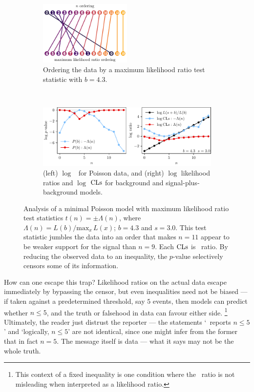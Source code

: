 \begin{figure}[tp]
\centering
\begin{subfigure}{\textwidth}
\centering
\includegraphics[width=0.5\textwidth]{figures/searches_cls_plots_with_pvals_order.pdf}
\caption{%
Ordering the data by a maximum likelihood ratio test statistic with $b=4.3$.
}
\end{subfigure}
\\[.5em]
\begin{subfigure}{\textwidth}
\centering
\includegraphics[width=\textwidth]{figures/searches_cls_plots_with_pvals_t.pdf}
\caption{%
(left) $\log$ \pvalues\ for Poisson data,
and (right) $\log$ likelihood ratios and $\log$ $\mathrm{CLs}$ for
background and signal-plus-background models.%
}
\end{subfigure}
\caption[
Analysis of a minimal Poisson model with maximum likelihood ratio
test statistics
]{%
Analysis of a minimal Poisson model with maximum likelihood ratio
test statistics $t(n) = \pm \Lambda(n)$,
where $\Lambda(n) = L(b)/\mathrm{max}_x\,L(x)$; $b = 4.3$ and $s = 3.0$.
This test statistic jumbles the data into an order that makes $n=11$ appear to
be weaker support for the signal than $n=9$.
Each $\mathrm{CLs}$ is \pvalue\ ratio.
By reducing the observed data to an inequality, the $p$-value selectively
censors some of its information.
}
\label{fig:searches_sb_t}
\end{figure}

How can one escape this trap?
Likelihood ratios on the actual data escape immediately by bypassing the
censor, but even inequalities need not be biased --- if taken against a
predetermined threshold, say $5$ events, then models can predict whether
$n \leq 5$, and the truth or falsehood in data can favour either side.%
\footnote{%
This context of a fixed inequality is one condition where the
\pvalue\ ratio is not misleading when interpreted as a likelihood ratio.%
}
Ultimately, the reader just distrust the reporter ---
the statements `\atlas\ reports $n \leq 5$' and `logically, $n \leq 5$' are not
identical, since one might infer from the former that in fact $n = 5$.
The message itself is data --- what it says may not be the whole truth.

